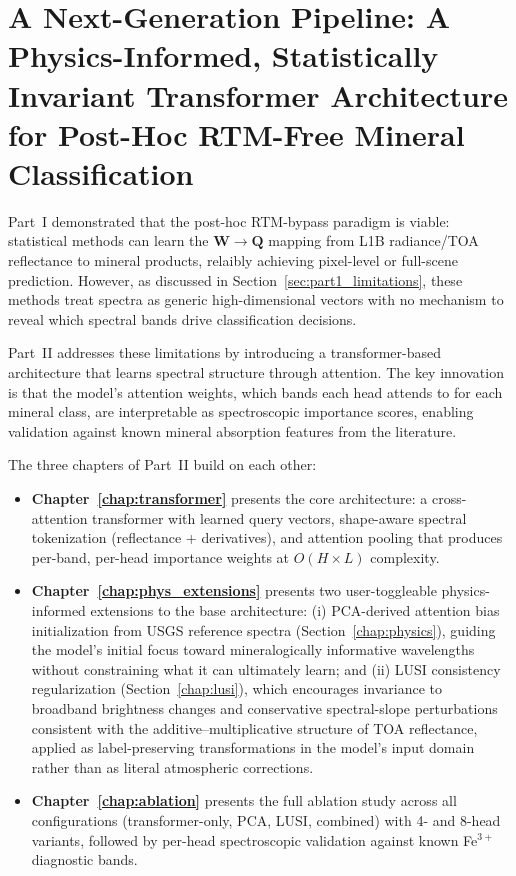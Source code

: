\documentclass[11pt]{report}
\begin{document}
\part{A Next-Generation Pipeline: A Physics-Informed, Statistically Invariant Transformer Architecture for Post-Hoc RTM-Free Mineral Classification}
\label{part:transformer}

Part~I demonstrated that the post-hoc RTM-bypass paradigm is viable: statistical methods can learn the $\mathbf{W} \rightarrow \mathbf{Q}$ mapping from L1B radiance/TOA reflectance to mineral products, relaibly achieving pixel-level or full-scene prediction.
However, as discussed in Section~\ref{sec:part1_limitations}, these methods treat spectra as generic high-dimensional vectors with no mechanism to reveal which spectral bands drive classification decisions.

Part~II addresses these limitations by introducing a transformer-based architecture that learns spectral structure through attention. 
The key innovation is that the model's attention weights, which bands each head attends to for each mineral class, are interpretable as spectroscopic importance scores, enabling validation against known mineral absorption features from the literature.

The three chapters of Part~II build on each other:
\begin{itemize}
  \item \textbf{Chapter~\ref{chap:transformer}} presents the core architecture: a cross-attention transformer with learned query vectors, shape-aware spectral tokenization (reflectance + derivatives), and attention pooling that produces per-band, per-head importance weights at $O(H \times L)$ complexity.
  \item \textbf{Chapter~\ref{chap:phys_extensions}} presents two user-toggleable physics-informed extensions to the base architecture: (i) PCA-derived attention bias initialization from USGS reference spectra (Section~\ref{chap:physics}), guiding the model's initial focus toward mineralogically informative wavelengths without constraining what it can ultimately learn; and (ii) LUSI consistency regularization (Section~\ref{chap:lusi}), which encourages invariance to broadband brightness changes and conservative spectral-slope perturbations consistent with the additive--multiplicative structure of TOA reflectance, applied as label-preserving transformations in the model's input domain rather than as literal atmospheric corrections.
  \item \textbf{Chapter~\ref{chap:ablation}} presents the full ablation study across all configurations (transformer-only, PCA, LUSI, combined) with 4- and 8-head variants, followed by per-head spectroscopic validation against known Fe$^{3+}$ diagnostic bands.
\end{itemize}
\end{document}
